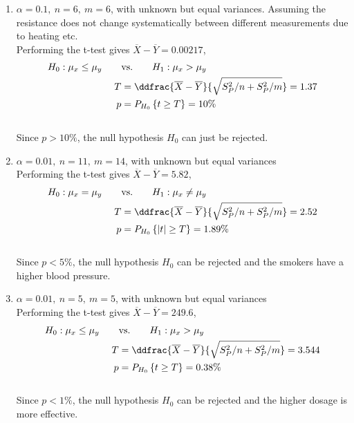 \begin{enumerate}
	\item $\alpha = 0.1,\ n = 6,\ m = 6$, with unknown but equal variances. Assuming the resistance does not change systematically between different measurements due to heating etc.\\
	Performing the t-test gives $ \overline{X} - \overline{Y} = 0.00217 $,\\
	
	\begin{align}
		H_0 : \mu_x \leq \mu_y \qquad &\text{vs.} \qquad H_1 : \mu_x > \mu_y \nonumber \\
		T &= \ddfrac{ \overline{X} - \overline{Y} }{\sqrt{S_P^2/n + S_P^2/m}} = 1.37\nonumber \\
		p &= P_{H_0}\left\{t \geq T\right\} = 10\% 
	\end{align}\\
	Since $ p > 10\% $, the null hypothesis $ H_0 $ can just be rejected.\\
	
	\item $\alpha = 0.01,\ n = 11,\ m = 14$, with unknown but equal variances\\
	Performing the t-test gives $ \overline{X} - \overline{Y} = 5.82 $,\\
	
	\begin{align}
		H_0 : \mu_x = \mu_y \qquad &\text{vs.} \qquad H_1 : \mu_x \neq \mu_y \nonumber \\
		T &= \ddfrac{ \overline{X} - \overline{Y} }{\sqrt{S_P^2/n + S_P^2/m}} = 2.52 \nonumber \\
		p &= P_{H_0}\left\{|t| \geq T\right\} = 1.89\% 
	\end{align}\\
	Since $ p < 5\% $, the null hypothesis $ H_0 $ can be rejected and the smokers have a higher blood pressure.\\
	
	\item $\alpha = 0.01,\ n = 5,\ m = 5$, with unknown but equal variances\\
	Performing the t-test gives $ \overline{X} - \overline{Y} = 249.6 $,\\
	
	\begin{align}
		H_0 : \mu_x \leq \mu_y \qquad &\text{vs.} \qquad H_1 : \mu_x > \mu_y \nonumber \\
		T &= \ddfrac{ \overline{X} - \overline{Y} }{\sqrt{S_P^2/n + S_P^2/m}} = 3.544 \nonumber \\
		p &= P_{H_0}\left\{t \geq T\right\} = 0.38\% 
	\end{align}\\
	Since $ p < 1\% $, the null hypothesis $ H_0 $ can be rejected and the higher dosage is more effective.\\
	

\end{enumerate}
